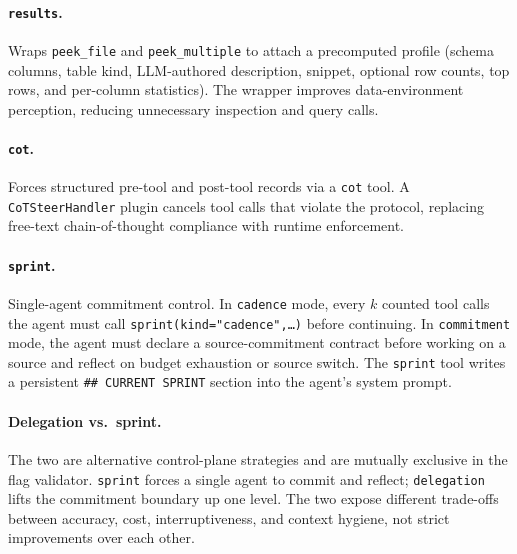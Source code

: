 \paragraph{\texttt{results}.} Wraps \texttt{peek\_file} and \texttt{peek\_multiple} to attach a precomputed profile (schema columns, table kind, LLM-authored description, snippet, optional row counts, top rows, and per-column statistics). The wrapper improves data-environment perception, reducing unnecessary inspection and query calls.

\paragraph{\texttt{cot}.} Forces structured pre-tool and post-tool records via a \texttt{cot} tool. A \texttt{CoTSteerHandler} plugin cancels tool calls that violate the protocol, replacing free-text chain-of-thought compliance with runtime enforcement.

\paragraph{\texttt{sprint}.} Single-agent commitment control. In \texttt{cadence} mode, every $k$ counted tool calls the agent must call \texttt{sprint(kind="cadence",\dots)} before continuing. In \texttt{commitment} mode, the agent must declare a source-commitment contract before working on a source and reflect on budget exhaustion or source switch. The \texttt{sprint} tool writes a persistent \texttt{\#\# CURRENT SPRINT} section into the agent's system prompt.

\paragraph{Delegation vs.\ sprint.} The two are alternative control-plane strategies and are mutually exclusive in the flag validator. \texttt{sprint} forces a single agent to commit and reflect; \texttt{delegation} lifts the commitment boundary up one level. The two expose different trade-offs between accuracy, cost, interruptiveness, and context hygiene, not strict improvements over each other.
